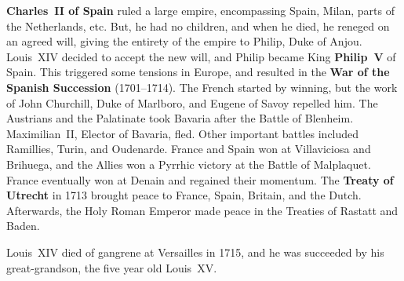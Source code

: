 \textbf{Charles~II of Spain} ruled a large empire, encompassing Spain, Milan, parts of the Netherlands, etc.
But, he had no children, and when he died, he reneged on an agreed will,
giving the entirety of the empire to Philip, Duke of Anjou.
Louis~XIV decided to accept the new will, and Philip became King \textbf{Philip~V} of Spain.
This triggered some tensions in Europe, and resulted in the \textbf{War of the Spanish Succession} (1701--1714).
The French started by winning, but the work of John Churchill, Duke of Marlboro, and Eugene of Savoy repelled him.
The Austrians and the Palatinate took Bavaria after the Battle of Blenheim.
Maximilian~II, Elector of Bavaria, fled.
Other important battles included Ramillies, Turin, and Oudenarde.
France and Spain won at Villaviciosa and Brihuega,
and the Allies won a Pyrrhic victory at the Battle of Malplaquet.
France eventually won at Denain and regained their momentum.
The \textbf{Treaty of Utrecht} in 1713 brought peace to France, Spain, Britain, and the Dutch.
Afterwards, the Holy Roman Emperor made peace in the Treaties of Rastatt and Baden.

Louis~XIV died of gangrene at Versailles in 1715,
and he was succeeded by his great-grandson, the five year old Louis~XV\@.



